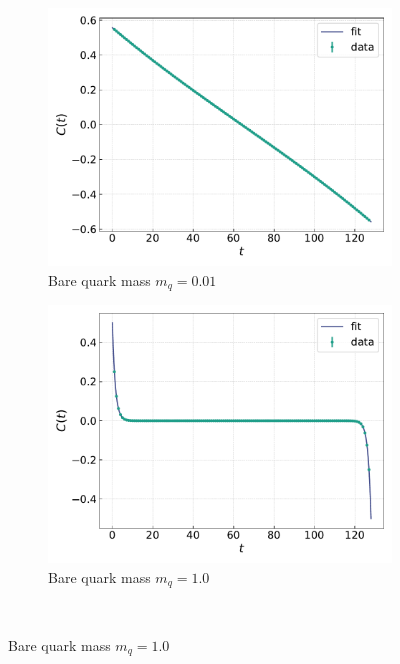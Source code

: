 \begin{figure}[h!]
    \centering
    \begin{subfigure}[b]{0.47\textwidth}
        \includegraphics[width=\textwidth]{figures/correlator/corrs_free/corr_small.pdf}
        \caption{Bare quark mass $m_q = 0.01$}
    \end{subfigure}
    \hfill
    \begin{subfigure}[b]{0.47\textwidth}
        \includegraphics[width=\textwidth]{figures/correlator/corrs_free/corr_big.pdf}
        \caption{Bare quark mass $m_q = 1.0$}
    \end{subfigure}
    \\
    \vspace{10pt}

\end{figure}

